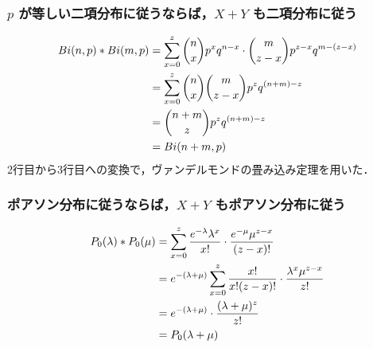 \documentclass[titlepage,a4paper]{jsarticle}
\begin{document}
\subsubsection{$p$ が等しい二項分布に従うならば，$X + Y$ も二項分布に従う}\label{6_2_1}
\begin{align}
  Bi(n,p) * Bi(m,p) & = \sum_{x=0}^{z} \binom{n}{x} p^x q^{n-x} \cdot \binom{m}{z-x} p^{z-x} q^{m-(z-x)} \notag \\
                    & = \sum_{x=0}^{z} \binom{n}{x} \binom{m}{z-x} p^z q^{(n+m)-z} \notag                       \\
                    & = \binom{n+m}{z} p^z q^{(n+m)-z} \notag                                                   \\
                    & = Bi(n+m,p) \notag                                                                        \\
\end{align}
2行目から3行目への変換で，ヴァンデルモンドの畳み込み定理を用いた．
\subsubsection{ポアソン分布に従うならば，$X + Y$ もポアソン分布に従う}\label{6_2_2}
\begin{align}
  P_0(\lambda) * P_0(\mu) & = \sum_{x=0}^{z} \frac{e^{-\lambda} \lambda^x}{x!} \cdot \frac{e^{-\mu} \mu^{z-x}}{(z-x)!} \notag    \\
                          & = e^{-(\lambda+\mu)} \sum_{x=0}^{z} \frac{x!}{x! (z-x)!} \cdot \frac{\lambda^x \mu^{z-x}}{z!} \notag \\
                          & = e^{-(\lambda+\mu)} \cdot \frac{(\lambda + \mu)^z}{z!} \notag                                       \\
                          & = P_0(\lambda + \mu) \notag
\end{align}
\end{document}
